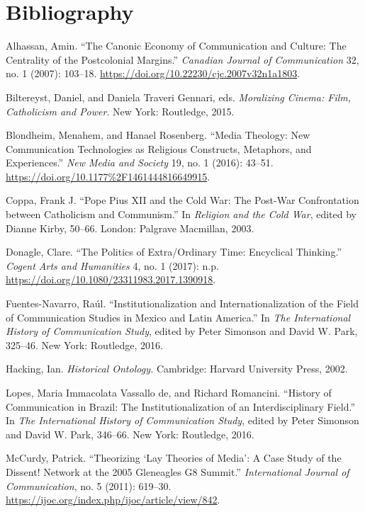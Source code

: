 \documentclass{tufte-handout}
\begin{document}
\section{Bibliography}\label{bibliography}

\begin{hangparas}{.25in}{1} 



Alhassan, Amin. ``The Canonic Economy of Communication and Culture: The
Centrality of the Postcolonial Margins.'' \emph{Canadian Journal of
Communication} 32, no. 1 (2007): 103­--18.
\url{https://doi.org/10.22230/cjc.2007v32n1a1803}.

Biltereyst, Daniel, and Daniela Traveri Gennari, eds. \emph{Moralizing Cinema: Film, Catholicism and Power}. New York: Routledge, 2015.

Blondheim, Menahem, and Hanael Rosenberg. ``Media Theology: New
Communication Technologies as Religious Constructs, Metaphors, and
Experiences.'' \emph{New Media and Society} 19, no. 1 (2016): 43--51.
\url{https://doi.org/10.1177\%2F1461444816649915}.

Coppa, Frank J. ``Pope Pius XII and the Cold War: The Post-War
Confrontation between Catholicism and Communism.'' In \emph{Religion and
the Cold War}, edited by Dianne Kirby, 50--66. London: Palgrave
Macmillan, 2003.

Donagle, Clare. ``The Politics of Extra/Ordinary Time: Encyclical
Thinking.'' \emph{Cogent Arts and Humanities} 4, no. 1 (2017): n.p.
\url{https://doi.org/10.1080/23311983.2017.1390918}.

Fuentes-Navarro, Ra\'{u}l. ``Institutionalization and Internationalization
of the Field of Communication Studies in Mexico and Latin America.'' In
\emph{The International History of Communication Study}, edited by Peter
Simonson and David W. Park, 325--46. New York: Routledge, 2016.

Hacking, Ian. \emph{Historical Ontology.} Cambridge: Harvard University
Press, 2002.

Lopes, Maria Immacolata Vassallo de, and Richard Romancini. ``History of
Communication in Brazil: The Institutionalization of an
Interdisciplinary Field.'' In \emph{The International History of
Communication Study}, edited by Peter Simonson and David W. Park,
346--66. New York: Routledge, 2016.

McCurdy, Patrick. ``Theorizing `Lay Theories of Media': A Case Study of
the Dissent! Network at the 2005 Gleneagles G8 Summit.''
\emph{International Journal of Communication}, no. 5 (2011): 619--30.
\url{https://ijoc.org/index.php/ijoc/article/view/842}.


\end{hangparas}
\end{document}
